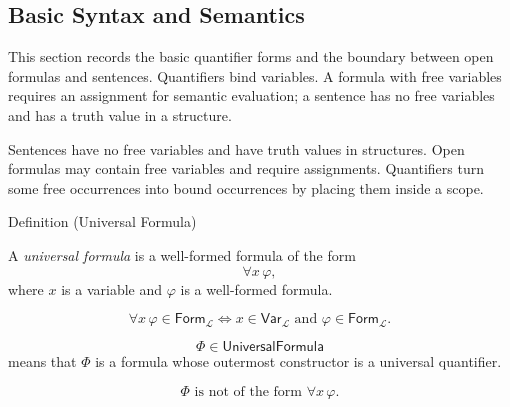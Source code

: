 
\subsection*{Basic Syntax and Semantics}

\begin{remark*}
This section records the basic quantifier forms and the boundary between open
formulas and sentences. Quantifiers bind variables. A formula with free
variables requires an assignment for semantic evaluation; a sentence has no
free variables and has a truth value in a structure.
\end{remark*}

\begin{remark*}[Exposition]
Sentences have no free variables and have truth values in structures. Open
formulas may contain free variables and require assignments. Quantifiers turn
some free occurrences into bound occurrences by placing them inside a scope.
\end{remark*}

\begin{definitionbox}{Definition (Universal Formula)}
\begin{definition}
\label{def:universal-q}
A \emph{universal formula} is a well-formed formula of the form
\[
\forall x\,\varphi,
\]
where \(x\) is a variable and \(\varphi\) is a well-formed formula.
\end{definition}
\end{definitionbox}

\begin{remark*}
\[
\forall x\,\varphi\in\mathsf{Form}_{\mathcal L}
\Longleftrightarrow
x\in\mathsf{Var}_{\mathcal L}
\text{ and }
\varphi\in\mathsf{Form}_{\mathcal L}.
\]
\end{remark*}

\begin{remark*}
\[
  \Phi\in\mathsf{UniversalFormula}
\] means that \(\Phi\) is a formula
whose outermost constructor is a universal quantifier.
\end{remark*}

\begin{remark*}
\[
\Phi \text{ is not of the form } \forall x\,\varphi.
\]
\end{remark*}

